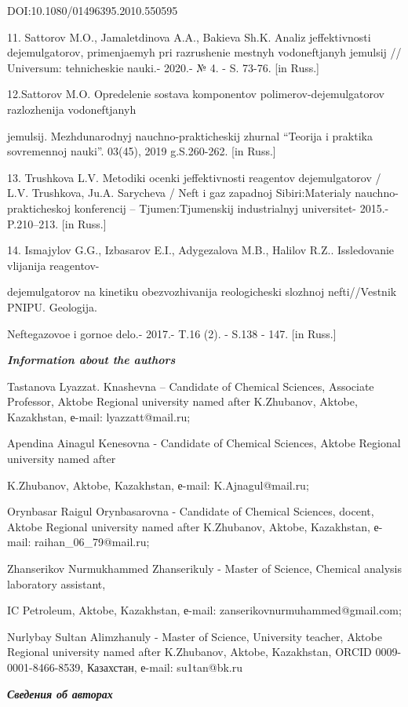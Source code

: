 \begin{noparindent}
DOI:10.1080/01496395.2010.550595

11. Sattorov M.O., Jamaletdinova A.A., Bakieva Sh.K. Analiz
jeffektivnosti dejemul\textquotesingle gatorov, primenjaemyh pri
razrushenie mestnyh vodoneftjanyh jemul\textquotesingle sij //
Universum: tehnicheskie nauki.- 2020.- № 4. - S. 73-76. {[}in Russ.{]}

12.Sattorov M.O. Opredelenie sostava komponentov
polimerov-dejemul\textquotesingle gatorov razlozhenija vodoneftjanyh

jemul\textquotesingle sij. Mezhdunarodnyj nauchno-prakticheskij zhurnal
``Teorija i praktika sovremennoj nauki''. 03(45), 2019 g.S.260-262.
{[}in Russ.{]}

13. Trushkova L.V. Metodiki ocenki jeffektivnosti reagentov
dejemul\textquotesingle gatorov / L.V. Trushkova, Ju.A. Sarycheva /
Neft\textquotesingle{} i gaz zapadnoj Sibiri:Materialy
nauchno-prakticheskoj konferencij -- Tjumen\textquotesingle:Tjumenskij
industrial\textquotesingle nyj universitet- 2015.- P.210--213. {[}in
Russ.{]}

14. Ismajylov G.G., Izbasarov E.I., Adygezalova M.B., Halilov R.Z..
Issledovanie vlijanija reagentov-

dejemul\textquotesingle gatorov na
kinetiku obezvozhivanija reologicheski slozhnoj nefti//Vestnik PNIPU.
Geologija.

Neftegazovoe i gornoe delo.- 2017.- T.16 (2). - S.138 - 147.
{[}in Russ.{]}
\end{noparindent}

\emph{{\bfseries Information about the authors}}

\begin{noparindent}
Tastanova Lyazzat. Knashevna -- Candidate of Chemical Sciences,
Associate Professor, Aktobe Regional university named after K.Zhubanov,
Aktobe, Kazakhstan, е-mail: lyazzatt@mail.ru;

Apendina Ainagul Kenesovna - Candidate of Chemical Sciences, Aktobe
Regional university named after

K.Zhubanov, Aktobe, Kazakhstan, е-mail:
K.Ajnagul@mail.ru;

Orynbasar Raigul Orynbasarovna - Candidate of Chemical Sciences, docent,
Aktobe Regional university named after K.Zhubanov, Aktobe, Kazakhstan,
е-mail: raihan\_06\_79@mail.ru;

Zhanserikov Nurmukhammed Zhanserikuly - Master of Science, Chemical
analysis laboratory assistant,

IC Petroleum, Aktobe, Kazakhstan, е-mail:
zanserikovnurmuhammed@gmail.com;

Nurlybay Sultan Alimzhanuly - Master of Science, University teacher,
Aktobe Regional university named after K.Zhubanov, Aktobe, Kazakhstan,
ORCID 0009-0001-8466-8539, Казахстан, е-mail: su1tan@bk.ru
\end{noparindent}
\newpage
\emph{{\bfseries Сведения об авторах}}

